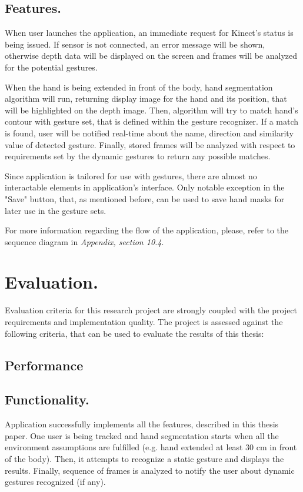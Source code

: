 \documentclass[a4paper,11pt,oneside]{article}
\begin{document}
\subsection{Features.}

When user launches the application, an immediate request for Kinect's status is being issued. If sensor is not connected, an error message will be shown, otherwise depth data will be displayed on the screen and frames will be analyzed for the potential gestures. 

When the hand is being extended in front of the body, hand segmentation algorithm will run, returning display image for the hand and its position, that will be highlighted on the depth image. Then, algorithm will try to match hand's contour with gesture set, that is defined within the gesture recognizer. If a match is found, user will be notified real-time about the name, direction and similarity value of detected gesture. Finally, stored frames will be analyzed with respect to requirements set by the dynamic gestures to return any possible matches.

Since application is tailored for use with gestures, there are almost no interactable elements in application's interface. Only notable exception in the "Save" button, that, as mentioned before, can be used to save hand masks for later use in the gesture sets.

For more information regarding the flow of the application, please, refer to the sequence diagram in \textit{Appendix, section 10.4}.

\section{Evaluation.}

Evaluation criteria for this research project are strongly coupled with the project requirements and implementation quality. The project is assessed against the following criteria, that can be used to evaluate the results of this thesis:

\subsection{Performance}


\subsection{Functionality.}
Application successfully implements all the features, described in this thesis paper. One user is being tracked and hand segmentation starts when all the environment assumptions are fulfilled (e.g. hand extended at least 30 cm in front of the body). Then, it attempts to recognize a static gesture and displays the results. Finally, sequence of frames is analyzed to notify the user about dynamic gestures recognized (if any).
\end{document}
